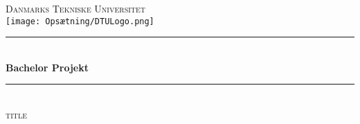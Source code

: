\begin{titlepage} %
	\newcommand{\HRule}{\rule{\linewidth}{0.5mm}} %
	
	\center %
	   
	
	
	\textsc{\LARGE Danmarks Tekniske Universitet}\\[1.5cm] %
	
    \texttt{[image: Opsætning/DTULogo.png]}\\
	
	
	
	\HRule\\[0.5cm]
	
	{\huge\bfseries Bachelor Projekt}\\[0.4cm] %

	\HRule\\[0.5cm]
	
	\textsc{\Large title}\\[1cm] %
	
    \vfill\vfill\vfill
    \begin{minipage}{\textwidth}
		\begin{flushleft}
            \centering


\end{flushleft}
\end{minipage}
\end{titlepage}
